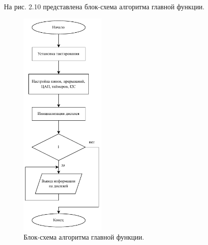 	
	На рис. 2.10 представлена блок-схема алгоритма главной функции.
	
	\begin{figure}[H]
    \centering
    \includegraphics[width=0.375\textwidth]{../image/main.pdf}
    \caption{Блок-схема алгоритма главной функции.}
	\end{figure}
	
